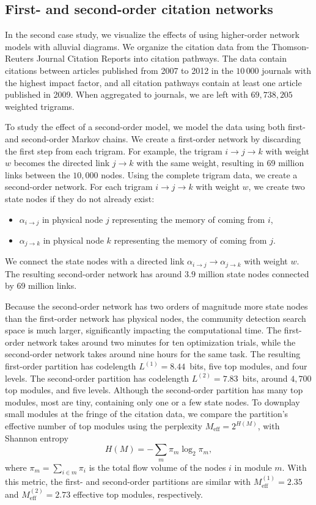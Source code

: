 \documentclass[aps,rmp,floats,floatfix,twocolumn,superscriptaddress,final]{revtex4-2}
\begin{document}
\subsection*{First- and second-order citation networks}

In the second case study, we visualize the effects of using higher-order network models with alluvial diagrams.
We organize the citation data from the Thomson-Reuters Journal Citation Reports into citation pathways.\cite{persson2016maps,wang2016large}
The data contain citations between articles published from 2007 to 2012 in the $10\,000$ journals with the highest impact factor, and all citation pathways contain at least one article published in 2009.
When aggregated to journals, we are left with $69,738,205$ weighted trigrams.

To study the effect of a second-order model, we model the data using both first- and second-order Markov chains.
We create a first-order network by discarding the first step from each trigram.
For example, the trigram $i\to j\to k$  with weight $w$ becomes the directed link $j\to k$ with the same weight,
resulting in 69 million links between the $10,000$ nodes.
%
Using the complete trigram data, we create a second-order network.
For each trigram $i\to j\to k$ with weight $w$, we create two state nodes if they do not already exist:
\begin{itemize}
    \item $\alpha_{i \to j}$ in physical node $j$ representing the memory of coming from $i$,
    \item $\alpha_{j \to k}$ in physical node $k$ representing the memory of coming from $j$.
\end{itemize}
We connect the state nodes with a directed link $\alpha_{i \to j} \to \alpha_{j \to k}$ with weight $w$.
The resulting second-order network has around $3.9$ million state nodes connected by 69 million links. %

Because the second-order network has two orders of magnitude more state nodes than the first-order network has physical nodes, the community detection search space is much larger, significantly impacting the computational time.
The first-order network takes around two minutes for ten optimization trials, while the second-order network takes around nine hours for the same task.
The resulting first-order partition has codelength $L^{(1)} = 8.44$~bits, five top modules, and four levels.
The second-order partition has codelength $L^{(2)} = 7.83$~bits, around $4,700$ top modules, and five levels.
Although the second-order partition has many top modules, most are tiny, containing only one or a few state nodes.
To downplay small modules at the fringe of the citation data, we compare the partition's effective number of top modules using the perplexity $M_{\text{eff}} = 2^{H(M)}$, with Shannon entropy
%
\begin{equation}
    H(M) = - \sum_m \pi_m \log_2 \pi_m,
\end{equation}
%
where $\pi_m = \sum_{i \in m} \pi_i$ is the total flow volume of the nodes $i$ in module $m$.
With this metric, the first- and second-order partitions are similar with $M_\text{eff}^{(1)} = 2.35$ and $M_\text{eff}^{(2)} = 2.73$ effective top modules, respectively.
\end{document}
